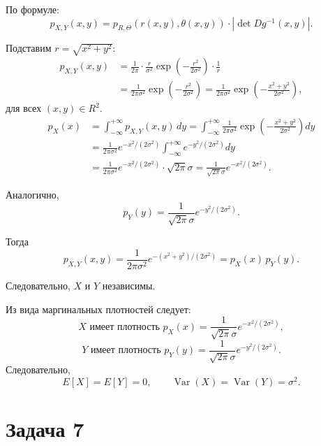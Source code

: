 \documentclass[a4paper,14pt]{extarticle}
\begin{document}
    По формуле:
    \[
    p_{X,Y}(x,y) = p_{R,\Theta}(r(x,y), \theta(x,y)) \cdot \left|\det Dg^{-1}(x,y)\right|.
    \]

    Подставим $r = \sqrt{x^2 + y^2}$:
    \[
    \begin{aligned}
    p_{X,Y}(x,y)
    &= \frac{1}{2\pi} \cdot \frac{r}{\sigma^2} \exp\!\left(-\frac{r^2}{2\sigma^2}\right) \cdot \frac{1}{r} \\
    &= \frac{1}{2\pi\sigma^2} \exp\!\left(-\frac{r^2}{2\sigma^2}\right)
    = \frac{1}{2\pi\sigma^2} \exp\!\left(-\frac{x^2 + y^2}{2\sigma^2}\right),
    \end{aligned}
    \]
    для всех $(x,y) \in R^2$.
    \[
    \begin{aligned}
    p_X(x)
    &= \int_{-\infty}^{+\infty} p_{X,Y}(x,y)\,dy
    = \int_{-\infty}^{+\infty} \frac{1}{2\pi\sigma^2}
    \exp\!\left(-\frac{x^2+y^2}{2\sigma^2}\right) dy \\
    &= \frac{1}{2\pi\sigma^2} e^{-x^2/(2\sigma^2)} 
    \int_{-\infty}^{+\infty} e^{-y^2/(2\sigma^2)} dy \\
    &= \frac{1}{2\pi\sigma^2} e^{-x^2/(2\sigma^2)} \cdot \sqrt{2\pi}\sigma
    = \frac{1}{\sqrt{2\pi}\sigma} e^{-x^2/(2\sigma^2)}.
    \end{aligned}
    \]

    Аналогично,
    \[
    p_Y(y) = \frac{1}{\sqrt{2\pi}\sigma} e^{-y^2/(2\sigma^2)}.
    \]

    Тогда
    \[
    p_{X,Y}(x,y)
    = \frac{1}{2\pi\sigma^2} e^{-(x^2+y^2)/(2\sigma^2)}
    = p_X(x) \, p_Y(y).
    \]

    Следовательно, $X$ и $Y$ независимы.

    Из вида маргинальных плотностей следует:
    \[
    X \text{ имеет плотность } 
    p_X(x)=\frac{1}{\sqrt{2\pi}\sigma} e^{-x^2/(2\sigma^2)},\]
    \[
    Y \text{ имеет плотность } 
    p_Y(y)=\frac{1}{\sqrt{2\pi}\sigma} e^{-y^2/(2\sigma^2)}.
    \]
    Следовательно,
    \[
    E[X] = E[Y] = 0, \qquad 
    \operatorname{Var}(X) = \operatorname{Var}(Y) = \sigma^2.
    \]


    \section*{Задача 7}
\end{document}
